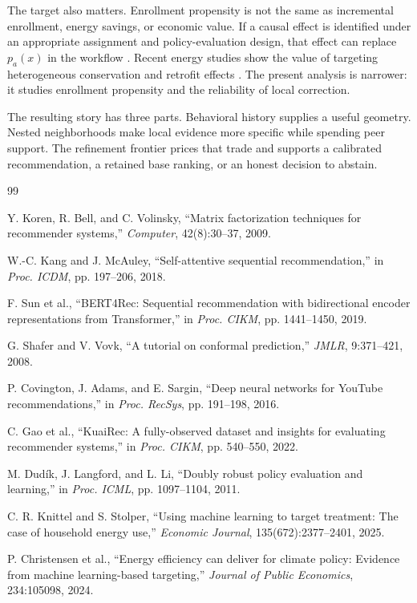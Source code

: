 \documentclass[10pt]{article}
\theoremstyle{noteplain}
\theoremstyle{definition}
\begin{document}
The target also matters. Enrollment propensity is not the same as incremental enrollment, energy savings, or economic value. If a causal effect is identified under an appropriate assignment and policy-evaluation design, that effect can replace $p_a(x)$ in the workflow \cite{dudik}. Recent energy studies show the value of targeting heterogeneous conservation and retrofit effects \cite{knittel,christensen}. The present analysis is narrower: it studies enrollment propensity and the reliability of local correction.

The resulting story has three parts. Behavioral history supplies a useful geometry. Nested neighborhoods make local evidence more specific while spending peer support. The refinement frontier prices that trade and supports a calibrated recommendation, a retained base ranking, or an honest decision to abstain.

\begin{thebibliography}{99}\small\setlength{\itemsep}{0pt}\setlength{\parskip}{0pt}

Y. Koren, R. Bell, and C. Volinsky, ``Matrix factorization techniques for recommender systems,'' \emph{Computer}, 42(8):30--37, 2009.

W.-C. Kang and J. McAuley, ``Self-attentive sequential recommendation,'' in \emph{Proc. ICDM}, pp. 197--206, 2018.

F. Sun et al., ``BERT4Rec: Sequential recommendation with bidirectional encoder representations from Transformer,'' in \emph{Proc. CIKM}, pp. 1441--1450, 2019.

G. Shafer and V. Vovk, ``A tutorial on conformal prediction,'' \emph{JMLR}, 9:371--421, 2008.

P. Covington, J. Adams, and E. Sargin, ``Deep neural networks for YouTube recommendations,'' in \emph{Proc. RecSys}, pp. 191--198, 2016.

C. Gao et al., ``KuaiRec: A fully-observed dataset and insights for evaluating recommender systems,'' in \emph{Proc. CIKM}, pp. 540--550, 2022.

M. Dud\'{i}k, J. Langford, and L. Li, ``Doubly robust policy evaluation and learning,'' in \emph{Proc. ICML}, pp. 1097--1104, 2011.

C. R. Knittel and S. Stolper, ``Using machine learning to target treatment: The case of household energy use,'' \emph{Economic Journal}, 135(672):2377--2401, 2025.

P. Christensen et al., ``Energy efficiency can deliver for climate policy: Evidence from machine learning-based targeting,'' \emph{Journal of Public Economics}, 234:105098, 2024.

\end{thebibliography}
\end{document}
